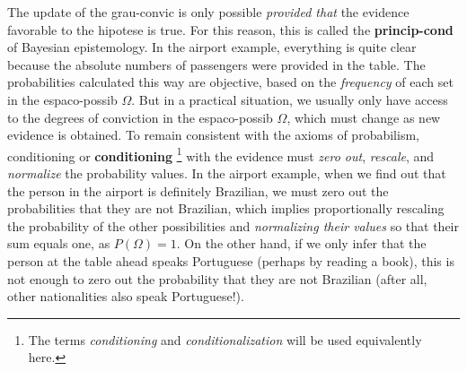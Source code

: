 \documentclass[./main_en.tex]{subfiles}
\begin{document}
\par The update of the \gls{grau-convic} is only possible \textit{provided that} the evidence favorable to the \gls{hipotese} is true. For this reason, this is called the \textbf{\gls{princip-cond}} of Bayesian epistemology. In the airport example, everything is quite clear because the absolute numbers of passengers were provided in the table. The probabilities calculated this way are objective, based on the \textit{frequency} of each set in the \gls{espaco-possib} $\Omega$. But in a practical situation, we usually only have access to the degrees of conviction in the \gls{espaco-possib} $\Omega$, which must change as new evidence is obtained. To remain consistent with the axioms of probabilism, conditioning or \textbf{\gls{conditioning}} \footnote{The terms \textit{conditioning} and \textit{conditionalization} will be used equivalently here.} with the evidence must \textit{zero out}, \textit{rescale}, and \textit{normalize} the probability values. In the airport example, when we find out that the person in the airport is definitely Brazilian, we must zero out the probabilities that they are not Brazilian, which implies proportionally rescaling the probability of the other possibilities and \textit{normalizing their values} so that their sum equals one, as $P(\Omega) = 1$. On the other hand, if we only infer that the person at the table ahead speaks Portuguese (perhaps by reading a book), this is not enough to zero out the probability that they are not Brazilian (after all, other nationalities also speak Portuguese!).
\end{document}
